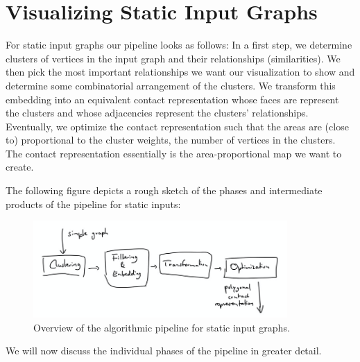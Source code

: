 \chapter{Visualizing Static Input Graphs}
\label{chap:visualizing-static-input-graphs}

For static input graphs our pipeline looks as follows: In a first step, we determine clusters of vertices in the input graph and their relationships (similarities). We then pick the most important relationships we want our visualization to show and determine some combinatorial arrangement of the clusters. We transform this embedding into an equivalent contact representation whose faces are represent the clusters and whose adjacencies represent the clusters' relationships. Eventually, we optimize the contact representation such that the areas are (close to) proportional to the cluster weights, \ie{} the number of vertices in the clusters. The contact representation essentially is the area-proportional map we want to create.

The following figure depicts a rough sketch of the phases and intermediate products of the pipeline for static inputs:

\begin{figure}[H]
	\centering\includegraphics[height=140px]{Resources/Pipeline-Static.png}
	\caption{Overview of the algorithmic pipeline for static input graphs.}
	\label{fig:pipeline-static}
\end{figure}

We will now discuss the individual phases of the pipeline in greater detail.





